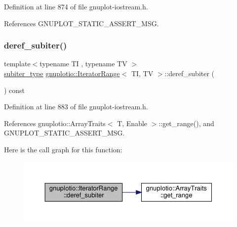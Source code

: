 Definition at line 874 of file gnuplot-\/iostream.\+h.



References G\+N\+U\+P\+L\+O\+T\+\_\+\+S\+T\+A\+T\+I\+C\+\_\+\+A\+S\+S\+E\+R\+T\+\_\+\+M\+SG.

\mbox{\label{classgnuplotio_1_1_iterator_range_a34ef78d431ad8a643d412851016b2122}} 
\subsubsection{\texorpdfstring{deref\+\_\+subiter()}{deref\_subiter()}}
{\footnotesize\ttfamily template$<$typename TI , typename TV $>$ \\
\hyperlink{classgnuplotio_1_1_iterator_range_a566ca30462a029f6df4ef16116f99acd}{subiter\+\_\+type} \hyperlink{classgnuplotio_1_1_iterator_range}{gnuplotio\+::\+Iterator\+Range}$<$ TI, TV $>$\+::deref\+\_\+subiter (\begin{DoxyParamCaption}{ }\end{DoxyParamCaption}) const\hspace{0.3cm}{\ttfamily [inline]}}



Definition at line 883 of file gnuplot-\/iostream.\+h.



References gnuplotio\+::\+Array\+Traits$<$ T, Enable $>$\+::get\+\_\+range(), and G\+N\+U\+P\+L\+O\+T\+\_\+\+S\+T\+A\+T\+I\+C\+\_\+\+A\+S\+S\+E\+R\+T\+\_\+\+M\+SG.

Here is the call graph for this function\+:\nopagebreak
\begin{figure}[H]
\begin{center}
\leavevmode
\includegraphics[width=350pt]{classgnuplotio_1_1_iterator_range_a34ef78d431ad8a643d412851016b2122_cgraph}
\end{center}
\end{figure}
\mbox{\label{classgnuplotio_1_1_iterator_range_a369f392a561011f8f1c93d13fd976878}} 

